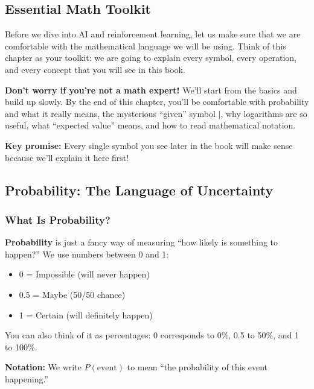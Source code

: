 \begin{chapterenv}

\chapter{Essential Math Toolkit}

Before we dive into AI and reinforcement learning, let us make sure that we are comfortable with the mathematical language we will be using. Think of this chapter as your toolkit: we are going to explain every symbol, every operation, and every concept that you will see in this book.

\begin{infobox}
\textbf{Don't worry if you're not a math expert!} We'll start from the basics and build up slowly. By the end of this chapter, you'll be comfortable with probability and what it really means, the mysterious ``given'' symbol $|$, why logarithms are so useful, what ``expected value'' means, and how to read mathematical notation.

\textbf{Key promise:} Every single symbol you see later in the book will make sense because we'll explain it here first!
\end{infobox}

\section{Probability: The Language of Uncertainty}

\subsection{What Is Probability?}

\textbf{Probability} is just a fancy way of measuring ``how likely is something to happen?'' We use numbers between 0 and 1:

\begin{itemize}[nosep]
    \item 0 = Impossible (will never happen)
    \item 0.5 = Maybe (50/50 chance)
    \item 1 = Certain (will definitely happen)
\end{itemize}

You can also think of it as percentages: 0 corresponds to 0\%, 0.5 to 50\%, and 1 to 100\%.

\textbf{Notation:} We write $P(\text{event})$ to mean ``the probability of this event happening.''


\end{chapterenv}
